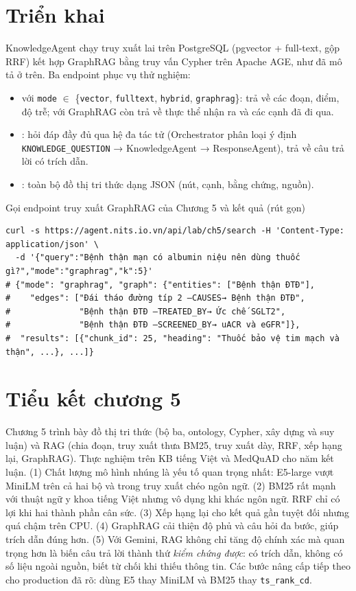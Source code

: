 \section{Triển khai}

KnowledgeAgent chạy truy xuất lai trên PostgreSQL (pgvector + full-text, gộp RRF) kết hợp GraphRAG bằng truy vấn Cypher trên Apache AGE, như đã mô tả ở trên. Ba endpoint phục vụ thử nghiệm:
\begin{itemize}
  \item {} với \texttt{mode} $\in$ \{\texttt{vector}, \texttt{fulltext}, \texttt{hybrid}, \texttt{graphrag}\}: trả về các đoạn, điểm, độ trễ; với GraphRAG còn trả về thực thể nhận ra và các cạnh đã đi qua.
  \item {}: hỏi đáp đầy đủ qua hệ đa tác tử (Orchestrator phân loại ý định \texttt{KNOWLEDGE\_QUESTION} → KnowledgeAgent → ResponseAgent), trả về câu trả lời có trích dẫn.
  \item {}: toàn bộ đồ thị tri thức dạng JSON (nút, cạnh, bằng chứng, nguồn).
\end{itemize}

\begin{code}{Gọi endpoint truy xuất GraphRAG của Chương 5 và kết quả (rút gọn)}
\label{lst:ch5-api}
\begin{verbatim}
curl -s https://agent.nits.io.vn/api/lab/ch5/search -H 'Content-Type: application/json' \
  -d '{"query":"Bệnh thận mạn có albumin niệu nên dùng thuốc gì?","mode":"graphrag","k":5}'
# {"mode": "graphrag", "graph": {"entities": ["Bệnh thận ĐTĐ"],
#    "edges": ["Đái tháo đường típ 2 —CAUSES→ Bệnh thận ĐTĐ",
#              "Bệnh thận ĐTĐ —TREATED_BY→ Ức chế SGLT2",
#              "Bệnh thận ĐTĐ —SCREENED_BY→ uACR và eGFR"]},
#  "results": [{"chunk_id": 25, "heading": "Thuốc bảo vệ tim mạch và thận", ...}, ...]}
\end{verbatim}
\end{code}

\section{Tiểu kết chương 5}

Chương 5 trình bày đồ thị tri thức (bộ ba, ontology, Cypher, xây dựng và suy luận) và RAG (chia đoạn, truy xuất thưa BM25, truy xuất dày, RRF, xếp hạng lại, GraphRAG). Thực nghiệm trên KB tiếng Việt và MedQuAD cho năm kết luận. (1) Chất lượng mô hình nhúng là yếu tố quan trọng nhất: E5-large vượt MiniLM trên cả hai bộ và trong truy xuất chéo ngôn ngữ. (2) BM25 rất mạnh với thuật ngữ y khoa tiếng Việt nhưng vô dụng khi khác ngôn ngữ. RRF chỉ có lợi khi hai thành phần cân sức. (3) Xếp hạng lại cho kết quả gần tuyệt đối nhưng quá chậm trên CPU. (4) GraphRAG cải thiện độ phủ và câu hỏi đa bước, giúp trích dẫn đúng hơn. (5) Với Gemini, RAG không chỉ tăng độ chính xác mà quan trọng hơn là biến câu trả lời thành thứ \emph{kiểm chứng được}: có trích dẫn, không có số liệu ngoài nguồn, biết từ chối khi thiếu thông tin. Các bước nâng cấp tiếp theo cho production đã rõ: dùng E5 thay MiniLM và BM25 thay \texttt{ts\_rank\_cd}.

